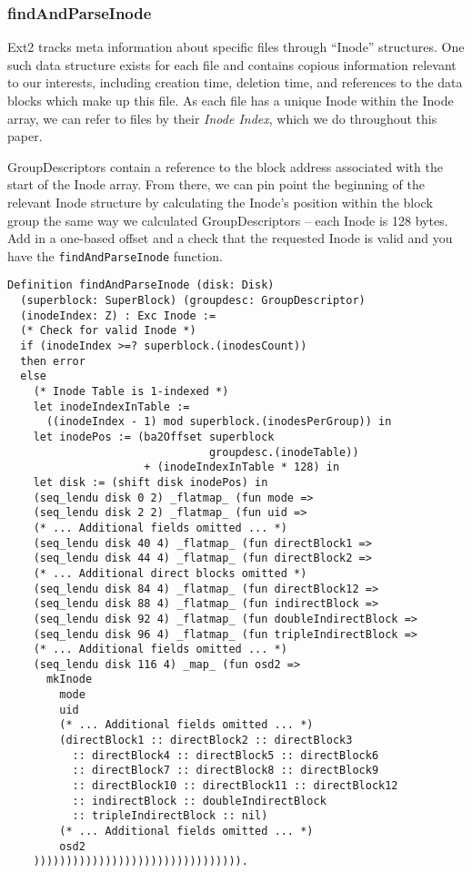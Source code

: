 \documentclass[nocopyrightspace]{sigplanconf}
\begin{document}
\subsubsection{findAndParseInode}

Ext2 tracks meta information about specific files through ``Inode''
structures. One such data structure exists for each file and contains copious
information relevant to our interests, including creation time, deletion time,
and references to the data blocks which make up this file. As each file has a
unique Inode within the Inode array, we can refer to files by their {\it Inode
Index}, which we do throughout this paper.

GroupDescriptors contain a reference to the block address associated with the
start of the Inode array. From there, we can pin point the beginning of the
relevant Inode structure by calculating the Inode's position within the block
group the same way we calculated GroupDescriptors -- each Inode is 128 bytes.
Add in a one-based offset and a check that the requested Inode is valid and
you have the {\tt findAndParseInode} function.

\begin{lstlisting}
Definition findAndParseInode (disk: Disk) 
  (superblock: SuperBlock) (groupdesc: GroupDescriptor)
  (inodeIndex: Z) : Exc Inode :=
  (* Check for valid Inode *)
  if (inodeIndex >=? superblock.(inodesCount))
  then error
  else
    (* Inode Table is 1-indexed *)
    let inodeIndexInTable := 
      ((inodeIndex - 1) mod superblock.(inodesPerGroup)) in
    let inodePos := (ba2Offset superblock
                               groupdesc.(inodeTable))
                     + (inodeIndexInTable * 128) in
    let disk := (shift disk inodePos) in
    (seq_lendu disk 0 2) _flatmap_ (fun mode =>
    (seq_lendu disk 2 2) _flatmap_ (fun uid =>
    (* ... Additional fields omitted ... *)
    (seq_lendu disk 40 4) _flatmap_ (fun directBlock1 =>
    (seq_lendu disk 44 4) _flatmap_ (fun directBlock2 =>
    (* ... Additional direct blocks omitted *)
    (seq_lendu disk 84 4) _flatmap_ (fun directBlock12 =>
    (seq_lendu disk 88 4) _flatmap_ (fun indirectBlock =>
    (seq_lendu disk 92 4) _flatmap_ (fun doubleIndirectBlock =>
    (seq_lendu disk 96 4) _flatmap_ (fun tripleIndirectBlock =>
    (* ... Additional fields omitted ... *)
    (seq_lendu disk 116 4) _map_ (fun osd2 =>
      mkInode
        mode
        uid
        (* ... Additional fields omitted ... *)
        (directBlock1 :: directBlock2 :: directBlock3
          :: directBlock4 :: directBlock5 :: directBlock6
          :: directBlock7 :: directBlock8 :: directBlock9
          :: directBlock10 :: directBlock11 :: directBlock12
          :: indirectBlock :: doubleIndirectBlock
          :: tripleIndirectBlock :: nil)
        (* ... Additional fields omitted ... *)
        osd2
    )))))))))))))))))))))))))))))))).
\end{lstlisting}
\end{document}
